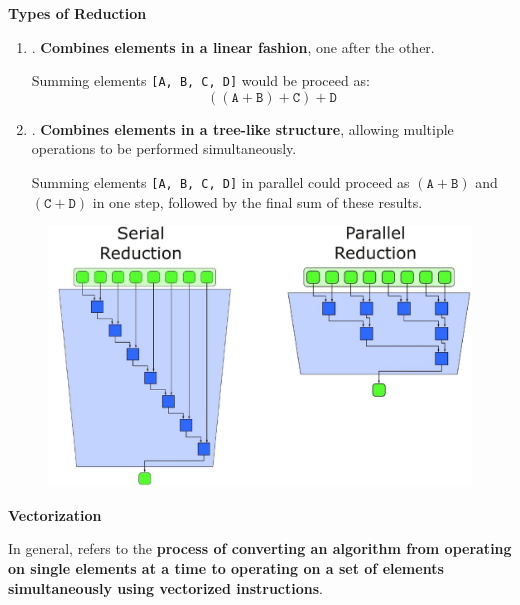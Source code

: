 \newpage

\begin{flushleft}
    \textcolor{Green3}{ \textbf{Types of Reduction}}
\end{flushleft}
\begin{enumerate}
    \item {}. \textbf{Combines elements in a linear fashion}, one after the other.
    \begin{examplebox}
        Summing elements \texttt{[A, B, C, D]} would be proceed as:
        \begin{equation*}
            \left(\left(\texttt{A} + \texttt{B}\right) + \texttt{C}\right) + \texttt{D}
        \end{equation*}
    \end{examplebox}

    \item {}. \textbf{Combines elements in a tree-like structure}, allowing multiple operations to be performed simultaneously.
    \begin{examplebox}
        Summing elements \texttt{[A, B, C, D]} in parallel could proceed as $\left(\texttt{A} + \texttt{B}\right)$ and $\left(\texttt{C} + \texttt{D}\right)$ in one step, followed by the final sum of these results.
    \end{examplebox}
\end{enumerate}

\begin{figure}[!htp]
    \centering
    \includegraphics[width=.84\textwidth]{img/reduction-pattern-1.pdf}
\end{figure}

\newpage

\begin{flushleft}
    \textcolor{Green3}{ \textbf{Vectorization}}
\end{flushleft}
In general,  refers to the \textbf{process of converting an algorithm from operating on single elements at a time to operating on a set of elements simultaneously using vectorized instructions}.

